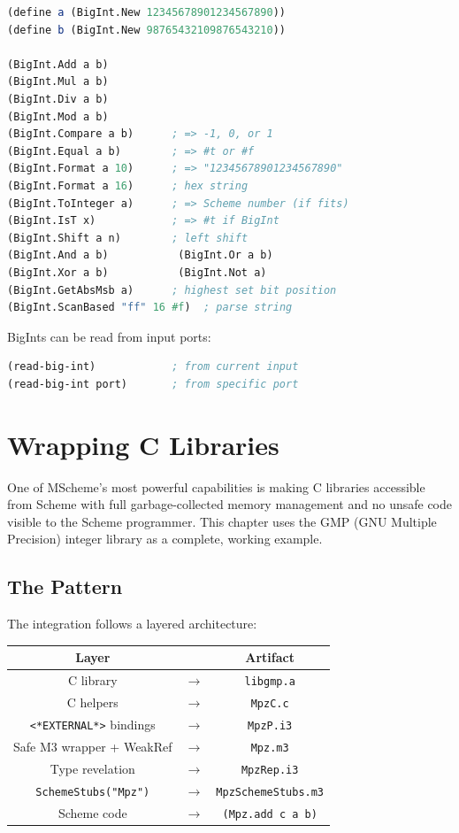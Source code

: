 \documentclass[12pt]{report}
\begin{document}
\begin{lstlisting}[language=Scheme]
(define a (BigInt.New 12345678901234567890))
(define b (BigInt.New 98765432109876543210))

(BigInt.Add a b)
(BigInt.Mul a b)
(BigInt.Div a b)
(BigInt.Mod a b)
(BigInt.Compare a b)      ; => -1, 0, or 1
(BigInt.Equal a b)        ; => #t or #f
(BigInt.Format a 10)      ; => "12345678901234567890"
(BigInt.Format a 16)      ; hex string
(BigInt.ToInteger a)      ; => Scheme number (if fits)
(BigInt.IsT x)            ; => #t if BigInt
(BigInt.Shift a n)        ; left shift
(BigInt.And a b)           (BigInt.Or a b)
(BigInt.Xor a b)           (BigInt.Not a)
(BigInt.GetAbsMsb a)      ; highest set bit position
(BigInt.ScanBased "ff" 16 #f)  ; parse string
\end{lstlisting}

BigInts can be read from input ports:
\begin{lstlisting}[language=Scheme]
(read-big-int)            ; from current input
(read-big-int port)       ; from specific port
\end{lstlisting}


\chapter{Wrapping C Libraries}\label{ch:clibrary}

One of MScheme's most powerful capabilities is making C libraries
accessible from Scheme with full garbage-collected memory management
and no unsafe code visible to the Scheme programmer.  This chapter
uses the GMP (GNU Multiple Precision) integer library as a
complete, working example.

\section{The Pattern}

The integration follows a layered architecture:

\begin{center}
\begin{tabular}{ccc}
\textbf{Layer} & & \textbf{Artifact} \\
\midrule
C library & $\longrightarrow$ & {\tt libgmp.a} \\
C helpers & $\longrightarrow$ & {\tt MpzC.c} \\
{\tt <*EXTERNAL*>} bindings & $\longrightarrow$ & {\tt MpzP.i3} \\
Safe M3 wrapper + WeakRef & $\longrightarrow$ & {\tt Mpz.m3} \\
Type revelation & $\longrightarrow$ & {\tt MpzRep.i3} \\
{\tt SchemeStubs("Mpz")} & $\longrightarrow$ & {\tt MpzSchemeStubs.m3} \\
Scheme code & $\longrightarrow$ & {\tt (Mpz.add c a b)} \\
\end{tabular}
\end{center}
\end{document}
